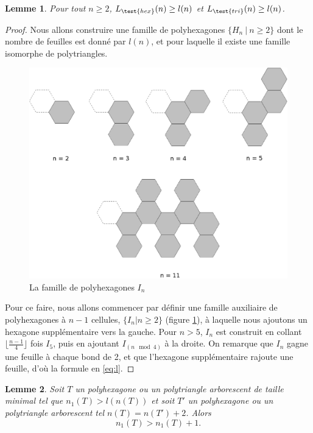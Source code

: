 \documentclass{article}
\newtheorem{lem}{Lemme}[section]
\theoremstyle{definition}
\newcommand{\Lhex}{L_{\test{hex}}}
\newcommand{\Ltri}{L_{\test{tri}}}
\begin{document}
\begin{lem}
   Pour tout $n \geq 2$, $\Lhex(n) \geq l(n)$ et $\Ltri(n) \geq l(n)$.
\end{lem}
\begin{proof}
   Nous allons construire une famille de polyhexagones 
   $\{ H_n\ |\ n \geq 2\}$ dont le nombre de feuilles est donné 
   par $l(n)$, et pour laquelle il existe une famille isomorphe 
   de polytriangles.
   
   \begin{figure}[h!]
   \caption{La famille de polyhexagones $I_n$}
   \label{fig:In}
   \includegraphics[width=\textwidth]{In.eps}
   \end{figure}

   Pour ce faire, nous allons commencer par définir une famille
   auxiliaire de polyhexagones à $n - 1$ cellules, $\{I_n | n \geq 2\}$ 
   (figure \ref{fig:In}), à laquelle nous ajoutons un hexagone 
   supplémentaire vers la gauche. Pour $n>5$, $I_n$ est construit en 
   collant $\lfloor \frac{n-1}{4} \rfloor$ fois $I_5$, puis en ajoutant 
   $I_{(n \mod 4)}$ à la droite. On remarque que $I_n$ gagne une feuille 
   à chaque bond de 2, et que l'hexagone supplémentaire rajoute une 
   feuille, d'où la formule en \eqref{eq:l}. 
\end{proof}

\begin{lem}
   \label{lem:hyp}
   Soit $T$ un polyhexagone ou un polytriangle arborescent de taille minimal tel que $n_1(T) > l(n(T))$ et soit $T'$ un polyhexagone ou un polytriangle arborescent tel $n(T) = n(T') + 2$. Alors
   \[
      n_1(T) > n_1(T) + 1.
   \]
\end{lem}
\end{document}
